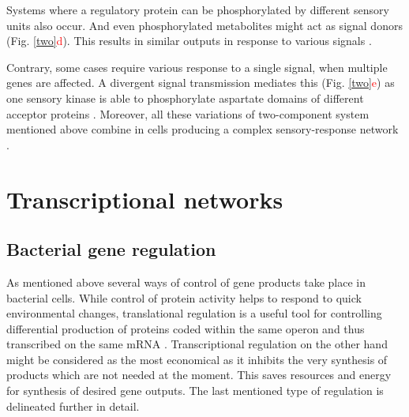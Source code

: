 Systems where a regulatory protein can be phosphorylated by different sensory units also occur.
And even phosphorylated metabolites might act as signal donors (Fig. \ref{two}\textcolor{red}{d}).
This results in similar outputs in response to various signals \cite{kaczmarczyk2014complex, chambonnier2016hybrid}.

Contrary, some cases require various response to a single signal, when multiple genes are affected.
A divergent signal transmission mediates this (Fig. \ref{two}\textcolor{red}{e}) as one sensory kinase is able to phosphorylate aspartate domains of different acceptor proteins \cite{mika2005two, groisman2016feedback}.
Moreover, all these variations of two-component system mentioned above combine in cells producing a complex sensory-response network \cite{kaczmarczyk2014complex, chambonnier2016hybrid}.



\section{Transcriptional networks}


\subsection{Bacterial gene regulation}
As mentioned above several ways of control of gene products take place in bacterial cells.
While control of protein activity helps to respond to quick environmental changes, translational regulation is a useful tool for controlling differential production of proteins coded within the same operon and thus transcribed on the same mRNA \cite{dar2018extensive}.
Transcriptional regulation on the other hand might be considered as the most economical as it inhibits the very synthesis of products which are not needed at the moment.
This saves resources and energy for synthesis of desired gene outputs.
The last mentioned type of regulation is delineated further in detail.


